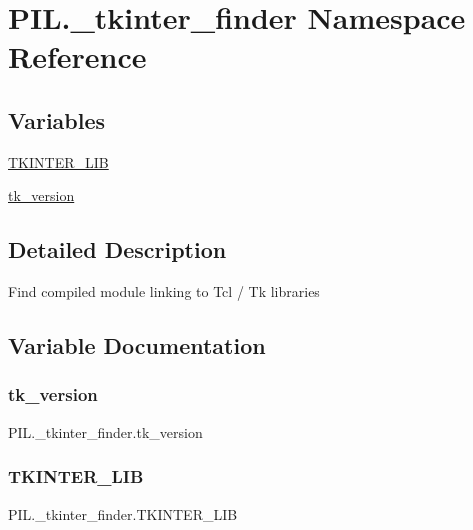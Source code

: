 \hypertarget{namespacePIL_1_1__tkinter__finder}{}\section{P\+I\+L.\+\_\+tkinter\+\_\+finder Namespace Reference}
\label{namespacePIL_1_1__tkinter__finder}
\subsection*{Variables}
\begin{DoxyCompactItemize}
\item 
\hyperlink{namespacePIL_1_1__tkinter__finder_a5efdcf31d0401f00ca3c49ffa6d7eb80}{T\+K\+I\+N\+T\+E\+R\+\_\+\+L\+IB}
\item 
\hyperlink{namespacePIL_1_1__tkinter__finder_aa221d2c6f2ecdab48868510058236b07}{tk\+\_\+version}
\end{DoxyCompactItemize}


\subsection{Detailed Description}
\begin{DoxyVerb}Find compiled module linking to Tcl / Tk libraries
\end{DoxyVerb}
 

\subsection{Variable Documentation}
\mbox{\label{namespacePIL_1_1__tkinter__finder_aa221d2c6f2ecdab48868510058236b07}} 
\subsubsection{\texorpdfstring{tk\+\_\+version}{tk\_version}}
{\footnotesize\ttfamily P\+I\+L.\+\_\+tkinter\+\_\+finder.\+tk\+\_\+version}

\mbox{\label{namespacePIL_1_1__tkinter__finder_a5efdcf31d0401f00ca3c49ffa6d7eb80}} 
\subsubsection{\texorpdfstring{T\+K\+I\+N\+T\+E\+R\+\_\+\+L\+IB}{TKINTER\_LIB}}
{\footnotesize\ttfamily P\+I\+L.\+\_\+tkinter\+\_\+finder.\+T\+K\+I\+N\+T\+E\+R\+\_\+\+L\+IB}

